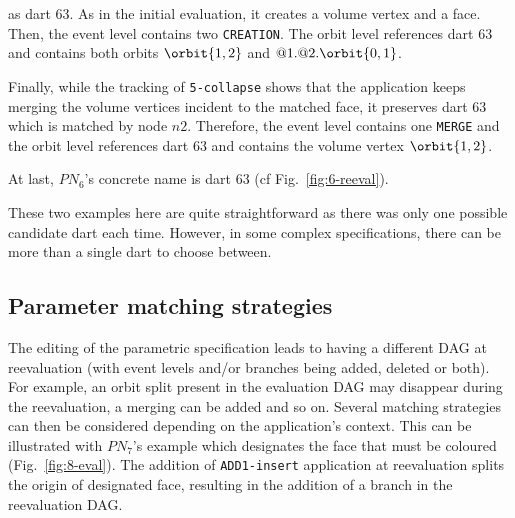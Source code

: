 \begin{description}
  as dart $63$. As in the initial evaluation, it creates a volume vertex and a face. %
  Then, the event level contains two \texttt{CREATION}. The orbit level references dart $63$ and contains both orbits $\orbit{1,2}$ and $@1.@2.\orbit{0,1}$.
  \item[Level 6] Finally, while the tracking of \texttt{5-collapse} shows that the application keeps merging the volume vertices incident to the matched face, it preserves dart $63$ which is matched by node $n2$. Therefore, the event level contains one \texttt{MERGE} and the orbit level references dart $63$ and contains the volume vertex $\orbit{1,2}$.
\end{description}

At last, $PN_6$'s concrete name is dart $63$ (cf Fig.~\ref{fig:6-reeval}). %

These two examples here are quite straightforward as there was only one possible candidate dart each time. %
However, in some com\-plex specifications, there can be more than a single dart to choose bet\-ween.

\subsection{Parameter matching strategies}

The editing of the parametric specification leads to having a dif\-fe\-rent DAG at reevaluation (with event levels and/or branches being added, deleted or both). %
For example, an orbit split present in the evaluation DAG may disappear during the reevaluation, a merging can be added and so on. %
Several matching strategies can then be %
considered depending on the application's context. %
This can be il\-lus\-tra\-ted with $PN_7$'s example which designates the face that must be coloured (Fig.~\ref{fig:8-eval}). %
The addition of \texttt{ADD1-insert} application at reevaluation splits the origin of designated face, resulting in the addition of a branch in the reevaluation DAG. 

